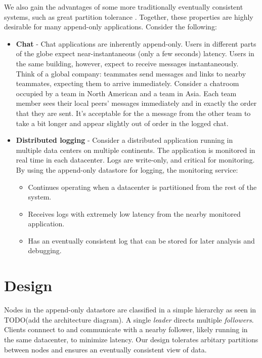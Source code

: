 \documentclass[11pt,english,twocolumn]{article}
\begin{document}
We also gain the advantages of some more traditionally eventually consistent
systems, such as great partition tolerance \cite{Dynamo}. Together, these
properties are highly desirable for many append-only applications. Consider the
following:

\begin{itemize}
	\item \textbf{Chat} - Chat applications are inherently append-only. Users
		in different parts of the globe expect near-instantaneous (only
		a few seconds) latency. Users in the same building, however,
		expect to receive messages instantaneously. Think of a global
		company: teammates send messages and links to nearby teammates,
		expecting them to arrive immediately. Consider a chatroom
		occupied by a team in North American and a team in Asia. Each
		team member sees their local peers' messages immediately and in
		exactly the order that they are sent. It's acceptable for the a
		message from the other team to take a bit longer and appear
		slightly out of order in the logged chat.
	\item \textbf{Distributed logging} - Consider a distributed application
		running in multiple data centers on multiple continents. The
		application is monitored in real time in each datacenter. Logs
		are write-only, and critical for monitoring. By using the
		append-only datastore for logging, the monitoring service:
		\begin{itemize}
			\item Continues operating when a datacenter is
				partitioned from the rest of the system.
			\item Receives logs with extremely low latency from the
				nearby monitored application.
			\item Has an eventually consistent log that can be
				stored for later analysis and debugging.
		\end{itemize}
\end{itemize}

\section{Design}
Nodes in the append-only datastore are classified in a simple hierarchy as seen
in TODO(add the architecture diagram). A single \textit{leader} directs multiple
\textit{followers}. Clients connnect to and communicate with a nearby follower,
likely running in the same datacenter, to minimize latency. Our design tolerates
arbitary partitions between nodes and ensures an eventually consistent view of
data.
\end{document}
